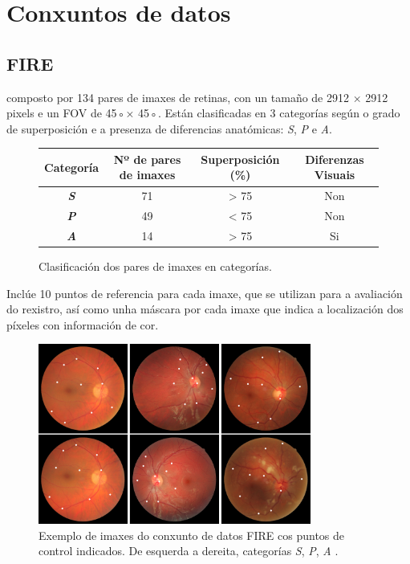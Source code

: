 \section{Conxuntos de datos}
\label{sec:Conxuntos de datos}

\subsection{FIRE}
\label{subsec:FIRE}

\cite{FIRE} composto por 134 pares de imaxes de retinas, con un tamaño de 2912 × 2912 pixels e un \gls{FOV} de 45◦× 45◦.
 Están clasificadas en 3 categorías según o grado de superposición e a presenza de diferencias anatómicas: \textit{S}, \textit{P} e \textit{A}.

 \begin{figure}[ht]
    \centering
    \setlength{\tabcolsep}{8pt} %
    \begin{tabular}{|c|c|c|c|}
        \hline
        \textbf{Categoría} & \textbf{Nº de pares de imaxes} & \textbf{Superposición (\%)} & \textbf{Diferenzas Visuais} \\
        \hline
        \textbf{\textit{\textsf{S}}} & 71 & > 75 & Non \\
        \hline
        \textbf{\textit{\textsf{P}}} & 49 & < 75 & Non \\
        \hline
        \textbf{\textit{\textsf{A}}} & 14 & > 75 & Si \\
        \hline
    \end{tabular}
    \caption{Clasificación dos pares de imaxes en categorías.}
    \label{tab:categorias}
\end{figure}

Inclúe 10 puntos de referencia para cada imaxe, que se utilizan para a avaliación do rexistro, así como unha máscara por cada imaxe que indica a localización dos píxeles con información de cor.

\begin{figure}[ht]
    \centering
    \includegraphics[width=0.8\textwidth]{imaxes/fire-ej.png}
    \caption{Exemplo de imaxes do conxunto de datos FIRE \cite{FIRE} cos puntos de control indicados. De esquerda a dereita, categorías \textit{\textsf{S}}, \textit{\textsf{P}}, \textit{\textsf{A}} .}
    \label{fig:fire_ej}
\end{figure}

